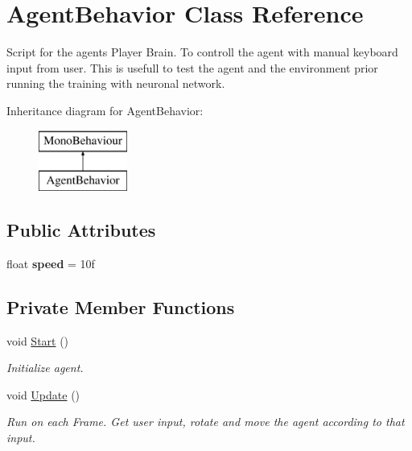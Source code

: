 \hypertarget{class_agent_behavior}{}\section{Agent\+Behavior Class Reference}
\label{class_agent_behavior}


Script for the agents Player Brain. To controll the agent with manual keyboard input from user. This is usefull to test the agent and the environment prior running the training with neuronal network.  


Inheritance diagram for Agent\+Behavior\+:\begin{figure}[H]
\begin{center}
\leavevmode
\includegraphics[height=2.000000cm]{class_agent_behavior}
\end{center}
\end{figure}
\subsection*{Public Attributes}
\begin{DoxyCompactItemize}
\item 
\mbox{\label{class_agent_behavior_a2845d2c397671f1080f364882f6d958c}} 
float {\bfseries speed} = 10f
\end{DoxyCompactItemize}
\subsection*{Private Member Functions}
\begin{DoxyCompactItemize}
\item 
void \mbox{\hyperlink{class_agent_behavior_a690b0d177658576951401f0be4e73bc3}{Start}} ()
\begin{DoxyCompactList}\small\item\em Initialize agent. \end{DoxyCompactList}\item 
void \mbox{\hyperlink{class_agent_behavior_a3bad002ebed4854eacbbb721bc147bf2}{Update}} ()
\begin{DoxyCompactList}\small\item\em Run on each Frame. Get user input, rotate and move the agent according to that input. \end{DoxyCompactList}\end{DoxyCompactItemize}
